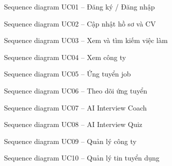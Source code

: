 \documentclass[../DoAn.tex]{subfiles}
\begin{document}
\begin{figure}[H]\centering{}\caption{Sequence diagram UC01 -- Đăng ký / Đăng nhập}\label{fig:seq-uc01}\end{figure}
\begin{figure}[H]\centering{}\caption{Sequence diagram UC02 -- Cập nhật hồ sơ và CV}\label{fig:seq-uc02}\end{figure}
\begin{figure}[H]\centering{}\caption{Sequence diagram UC03 -- Xem và tìm kiếm việc làm}\label{fig:seq-uc03}\end{figure}
\begin{figure}[H]\centering{}\caption{Sequence diagram UC04 -- Xem công ty}\label{fig:seq-uc04}\end{figure}
\begin{figure}[H]\centering{}\caption{Sequence diagram UC05 -- Ứng tuyển job}\label{fig:seq-uc05}\end{figure}
\begin{figure}[H]\centering{}\caption{Sequence diagram UC06 -- Theo dõi ứng tuyển}\label{fig:seq-uc06}\end{figure}
\begin{figure}[H]\centering{}\caption{Sequence diagram UC07 -- AI Interview Coach}\label{fig:seq-uc07}\end{figure}
\begin{figure}[H]\centering{}\caption{Sequence diagram UC08 -- AI Interview Quiz}\label{fig:seq-uc08}\end{figure}
\begin{figure}[H]\centering{}\caption{Sequence diagram UC09 -- Quản lý công ty}\label{fig:seq-uc09}\end{figure}
\begin{figure}[H]\centering{}\caption{Sequence diagram UC10 -- Quản lý tin tuyển dụng}\label{fig:seq-uc10}\end{figure}
\end{document}
